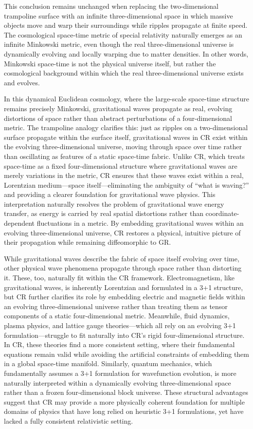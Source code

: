 \documentclass[aps,prd,reprint,superscriptaddress]{revtex4-2}
\begin{document}
This conclusion remains unchanged when replacing the two-dimensional trampoline surface with an infinite three-dimensional space in which massive objects move and warp their surroundings while ripples propagate at finite speed. The cosmological space-time metric of special relativity naturally emerges as an infinite Minkowski metric, even though the real three-dimensional universe is dynamically evolving and locally warping due to matter densities. In other words, Minkowski space-time is not the physical universe itself, but rather the cosmological background within which the real three-dimensional universe exists and evolves.

In this dynamical Euclidean cosmology, where the large-scale space-time structure remains precisely Minkowski, gravitational waves propagate as real, evolving distortions of space rather than abstract perturbations of a four-dimensional metric. The trampoline analogy clarifies this: just as ripples on a two-dimensional surface propagate within the surface itself, gravitational waves in CR exist within the evolving three-dimensional universe, moving through space over time rather than oscillating as features of a static space-time fabric. Unlike CR, which treats space-time as a fixed four-dimensional structure where gravitational waves are merely variations in the metric, CR ensures that these waves exist within a real, Lorentzian medium---space itself---eliminating the ambiguity of “what is waving?” and providing a clearer foundation for gravitational wave physics. This interpretation naturally resolves the problem of gravitational wave energy transfer, as energy is carried by real spatial distortions rather than coordinate-dependent fluctuations in a metric. By embedding gravitational waves within an evolving three-dimensional universe, CR restores a physical, intuitive picture of their propagation while remaining diffeomorphic to GR.

While gravitational waves describe the fabric of space itself evolving over time, other physical wave phenomena propagate through space rather than distorting it. These, too, naturally fit within the CR framework. Electromagnetism, like gravitational waves, is inherently Lorentzian and formulated in a 3+1 structure, but CR further clarifies its role by embedding electric and magnetic fields within an evolving three-dimensional universe rather than treating them as tensor components of a static four-dimensional metric. Meanwhile, fluid dynamics, plasma physics, and lattice gauge theories---which all rely on an evolving 3+1 formulation---struggle to fit naturally into CR's rigid four-dimensional structure. In CR, these theories find a more consistent setting, where their fundamental equations remain valid while avoiding the artificial constraints of embedding them in a global space-time manifold. Similarly, quantum mechanics, which fundamentally assumes a 3+1 formulation for wavefunction evolution, is more naturally interpreted within a dynamically evolving three-dimensional space rather than a frozen four-dimensional block universe. These structural advantages suggest that CR may provide a more physically coherent foundation for multiple domains of physics that have long relied on heuristic 3+1 formulations, yet have lacked a fully consistent relativistic setting.
\end{document}
